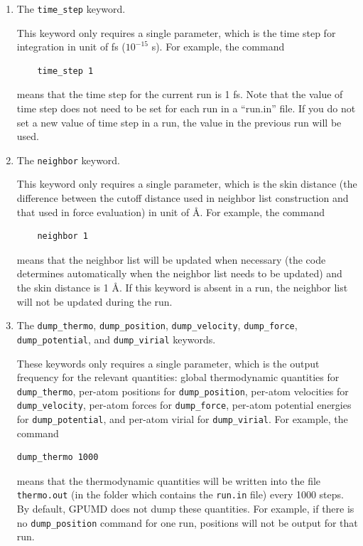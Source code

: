 \documentclass[12pt,a4paper]{report}
\begin{document}
\begin{enumerate}
\item The \verb"time_step" keyword.

This keyword only requires a single parameter, which is the time step for integration in unit of fs ($10^{-15}$ s). For example, the command
\begin{verbatim}
    time_step 1
\end{verbatim}
means that the time step for the current run is 1 fs. Note that the value of time step does not need to be set for each run in a ``run.in'' file. If you do not set a new value of time step in a run, the value in the previous run will be used.



\item The \verb"neighbor" keyword.

This keyword only requires a single parameter, which is the skin distance (the difference between the cutoff distance used in neighbor list construction and that used in force evaluation) in unit of \AA. For example, the command
\begin{verbatim}
    neighbor 1
\end{verbatim}
means that the neighbor list will be updated when necessary (the code determines automatically when the neighbor list needs to be updated) and the skin distance is 1 \AA. If this keyword is absent in a run, the neighbor list will not be updated during the run.


\item The \verb"dump_thermo", \verb"dump_position", \verb"dump_velocity", \verb"dump_force", \verb"dump_potential", and \verb"dump_virial" keywords.

These keywords only requires a single parameter, which is the output frequency for the relevant quantities: global thermodynamic quantities for \verb"dump_thermo", per-atom positions for  \verb"dump_position", per-atom velocities for \verb"dump_velocity",  per-atom forces for \verb"dump_force", per-atom  potential energies for \verb"dump_potential", and per-atom virial for \verb"dump_virial".
For example, the command
\begin{verbatim}
dump_thermo 1000
\end{verbatim}
means that the thermodynamic quantities will be written into the file \verb"thermo.out" (in the folder which contains the \verb"run.in" file) every 1000 steps.
By default, GPUMD does not dump these quantities. For example, if there is no \verb"dump_position" command for one run, positions will not be output for that run.



\end{enumerate}
\end{document}
